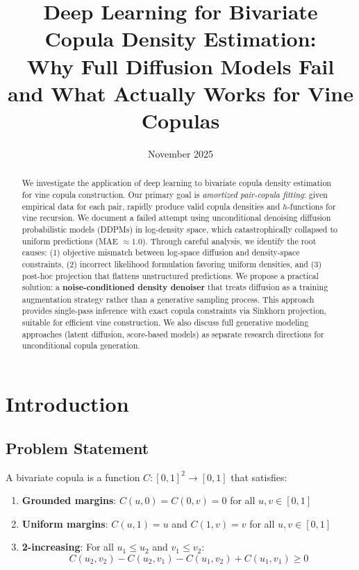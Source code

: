 \documentclass[11pt]{article}
\title{Deep Learning for Bivariate Copula Density Estimation:\\
Why Full Diffusion Models Fail and What Actually Works for Vine Copulas}
\author{}
\date{November 2025}
\begin{document}
\maketitle

\begin{abstract}
We investigate the application of deep learning to bivariate copula density estimation for vine copula construction. Our primary goal is \emph{amortized pair-copula fitting}: given empirical data for each pair, rapidly produce valid copula densities and $h$-functions for vine recursion. We document a failed attempt using unconditional denoising diffusion probabilistic models (DDPMs) in log-density space, which catastrophically collapsed to uniform predictions (MAE $\approx 1.0$). Through careful analysis, we identify the root causes: (1) objective mismatch between log-space diffusion and density-space constraints, (2) incorrect likelihood formulation favoring uniform densities, and (3) post-hoc projection that flattens unstructured predictions. We propose a practical solution: a \textbf{noise-conditioned density denoiser} that treats diffusion as a training augmentation strategy rather than a generative sampling process. This approach provides single-pass inference with exact copula constraints via Sinkhorn projection, suitable for efficient vine construction. We also discuss full generative modeling approaches (latent diffusion, score-based models) as separate research directions for unconditional copula generation.
\end{abstract}

\section{Introduction}

\subsection{Problem Statement}

A bivariate copula is a function $C: [0,1]^2 \to [0,1]$ that satisfies:
\begin{enumerate}
    \item \textbf{Grounded margins}: $C(u, 0) = C(0, v) = 0$ for all $u,v \in [0,1]$
    \item \textbf{Uniform margins}: $C(u, 1) = u$ and $C(1, v) = v$ for all $u,v \in [0,1]$
    \item \textbf{2-increasing}: For all $u_1 \leq u_2$ and $v_1 \leq v_2$:
    \begin{equation}
    C(u_2, v_2) - C(u_2, v_1) - C(u_1, v_2) + C(u_1, v_1) \geq 0
    \end{equation}
\end{enumerate}
\end{document}
